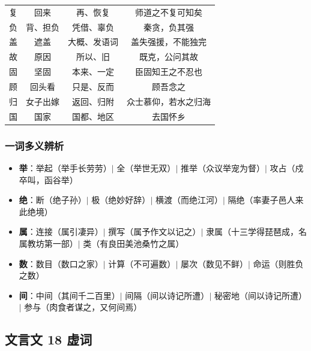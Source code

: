 \begin{center}
\begin{tabular}{c|c|c|c}
复 & 回来 & 再、恢复 & 师道之不复可知矣 \\
负 & 背、担负 & 凭借、辜负 & 秦贪，负其强 \\
盖 & 遮盖 & 大概、发语词 & 盖失强援，不能独完 \\
故 & 原因 & 所以、旧 & 既克，公问其故 \\
固 & 坚固 & 本来、一定 & 臣固知王之不忍也 \\
顾 & 回头看 & 只是、反而 & 顾吾念之 \\
归 & 女子出嫁 & 返回、归附 & 众士慕仰，若水之归海 \\
国 & 国家 & 国都、地区 & 去国怀乡 \\
\end{tabular}
\end{center}

\subsubsection{一词多义辨析}

\begin{itemize}
  \item \textbf{举}：举起（举手长劳劳）$\mid$ 全（举世无双）$\mid$ 推举（众议举宠为督）$\mid$ 攻占（戍卒叫，函谷举）
  \item \textbf{绝}：断（绝子孙）$\mid$ 极（绝妙好辞）$\mid$ 横渡（而绝江河）$\mid$ 隔绝（率妻子邑人来此绝境）
  \item \textbf{属}：连接（属引凄异）$\mid$ 撰写（属予作文以记之）$\mid$ 隶属（十三学得琵琶成，名属教坊第一部）$\mid$ 类（有良田美池桑竹之属）
  \item \textbf{数}：数目（数口之家）$\mid$ 计算（不可遍数）$\mid$ 屡次（数见不鲜）$\mid$ 命运（则胜负之数）
  \item \textbf{间}：中间（其间千二百里）$\mid$ 间隔（间以诗记所遭）$\mid$ 秘密地（间以诗记所遭）$\mid$ 参与（肉食者谋之，又何间焉）
\end{itemize}

\subsection{文言文 18 虚词}

